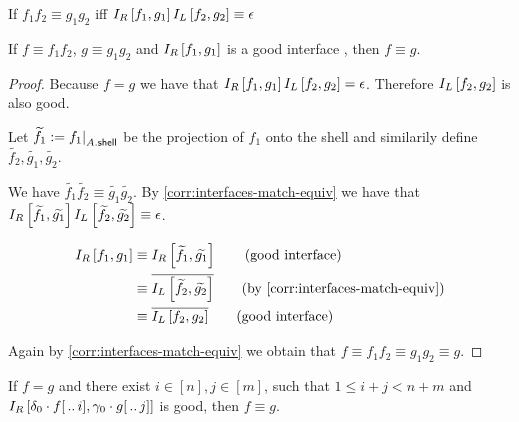 \begin{corollary} \label{corr:interfaces-match-equiv}
    If $f_1f_2 \equiv g_1g_2$ iff $I_R \left[ f_1, g_1 \right]I_L \left[ f_2, g_2 \right] \equiv \epsilon$
\end{corollary}

\begin{lemma}
    If $f \equiv f_1f_2$, $g \equiv g_1g_2$ and $I_R \left[ f_1, g_1 \right]$ is a good interface , then $f \equiv g$.
\end{lemma}
\begin{proof}

    Because $f = g$ we have that $I_R \left[ f_1, g_1 \right]I_L \left[ f_2, g_2 \right] = \epsilon$.
    Therefore $I_L \left[ f_2, g_2 \right]$ is also good.

    Let $\widetilde{f_1} := {f_1|}_{A . \mathsf{shell}}$ be the projection of $f_1$ onto the shell and similarily define $\widetilde{f_2}, \widetilde{g_1}, \widetilde{g_2}$.


    We have $\widetilde{f_1}\widetilde{f_2} \equiv \widetilde{g_1}\widetilde{g_2}$.
    By \cref{corr:interfaces-match-equiv} we have that
    $ I_R \left[ \widetilde{f_1}, \widetilde{g_1} \right]
        I_L \left[ \widetilde{f_2}, \widetilde{g_2} \right]
        \equiv \epsilon$.

    \begin{align*}
        \rint{f_1}{g_1} & \equiv \rint{\widetilde{f_1}}{\widetilde{g_1}} \tag{good interface}                              \\
                        & \equiv \inv{\lint{\widetilde{f_2}}{\widetilde{g_2}}} \tag{by \cref{corr:interfaces-match-equiv}} \\
                        & \equiv \inv{\lint{f_2}{g_2}} \tag{good interface}
    \end{align*}

    Again by \cref{corr:interfaces-match-equiv} we obtain that $f \equiv f_1f_2 \equiv g_1g_2 \equiv g$.

\end{proof}


\begin{claim}\label{claim:progress_for_good_interface}
    If $f = g$ and there exist $i \in [n], j \in [m]$, such that $1 \leq i + j < n+m$ and $I_R \left[ \delta_0 \cdot f[\,..\,i], \gamma_0 \cdot g[\,..\,j] \right]$ is good, then $f \equiv g$.
\end{claim}

